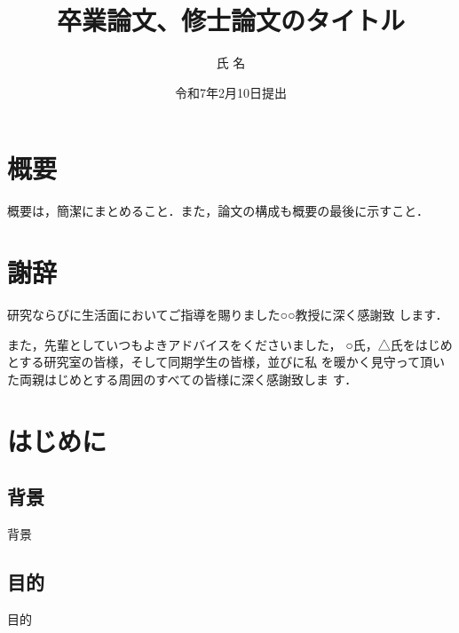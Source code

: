 \documentclass[12pt,epsf,dvipdfmx]{jreport}
\begin{document}
\title{卒業論文、修士論文のタイトル}
\author{氏 名}
\date{令和7年2月10日提出}
\maketitle

\setcounter{page}{1}
\chapter*{概要}

 概要は，簡潔にまとめること．また，論文の構成も概要の最後に示すこと．



\chapter*{謝辞}


研究ならびに生活面においてご指導を賜りました○○教授に深く感謝致
します．

また，先輩としていつもよきアドバイスをくださいました，
○氏，△氏をはじめとする研究室の皆様，そして同期学生の皆様，並びに私
を暖かく見守って頂いた両親はじめとする周囲のすべての皆様に深く感謝致しま
す．

\tableofcontents %
\listoffigures %
\listoftables %


\chapter{はじめに}
\setcounter{page}{1}   %

 \section{背景}
 背景


 \section{目的}
 目的
\end{document}
